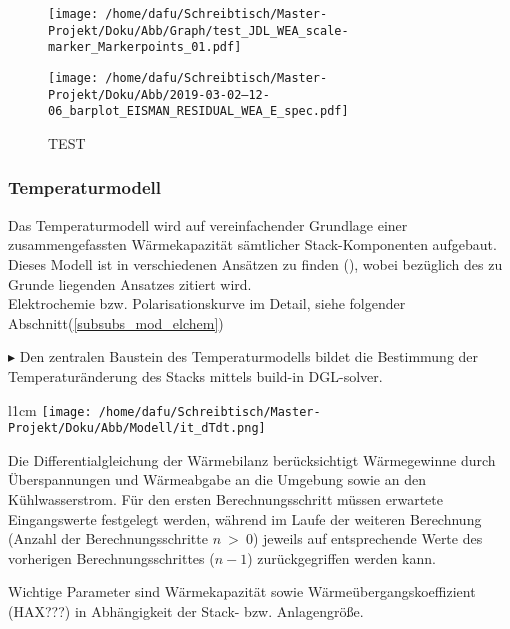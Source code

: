 \documentclass[onecolumn,10pt,titlepage]{article}
\begin{document}

\begin{figure}[H]
	
	\centering
	\texttt{[image: /home/dafu/Schreibtisch/Master-Projekt/Doku/Abb/Graph/test\_JDL\_WEA\_scale-marker\_Markerpoints\_01.pdf]}
	
	\texttt{[image: /home/dafu/Schreibtisch/Master-Projekt/Doku/Abb/2019-03-02--12-06\_barplot\_EISMAN\_RESIDUAL\_WEA\_E\_spec.pdf]}
	\caption{TEST }
	\label{fig:Test} 
\end{figure} 

 \subsubsection{Temperaturmodell}
 \label{subsubs_mod_TEmp}
Das Temperaturmodell wird auf vereinfachender Grundlage einer zusammengefassten Wärmekapazität sämtlicher Stack-Komponenten aufgebaut. Dieses Modell ist in verschiedenen Ansätzen zu finden (\cite{Espinosa-Lopez2018,Gabrielli2016}), wobei bezüglich des zu Grunde liegenden Ansatzes \cite{Ulleberg2003} zitiert wird.\\
Elektrochemie bzw. Polarisationskurve im Detail, siehe folgender Abschnitt(\ref{subsubs_mod_elchem})

$\blacktriangleright$ Den zentralen Baustein des Temperaturmodells bildet die Bestimmung der Temperaturänderung des Stacks mittels build-in DGL-solver. 
\begin{wrapfigure}{l}{1cm}
	\texttt{[image: /home/dafu/Schreibtisch/Master-Projekt/Doku/Abb/Modell/it\_dTdt.png]}
\end{wrapfigure}
 Die Differentialgleichung der Wärmebilanz berücksichtigt Wärmegewinne durch Überspannungen und  Wärmeabgabe an die Umgebung sowie an den Kühlwasserstrom. Für den ersten Berechnungsschritt müssen erwartete Eingangswerte festgelegt werden, während im Laufe der weiteren Berechnung (Anzahl der Berechnungsschritte $n~>~0$) jeweils auf entsprechende Werte des vorherigen Berechnungsschrittes ($n-1$) zurückgegriffen werden kann.

Wichtige Parameter sind Wärmekapazität sowie Wärmeübergangskoeffizient (HAX???) in Abhängigkeit der Stack- bzw. Anlagengröße. 
\newline


%
\end{document}
